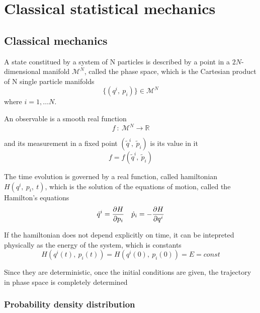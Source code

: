 \part{Classical statistical mechanics}

\chapter{Classical mechanics}

    A state constitued by a system of N particles is described by a point in a $2N$-dimensional manifold $\mathcal M^N$, called the phase space, which is the Cartesian product of N single particle manifolds 
    \begin{equation*}
        \{(q^i, ~p_i)\} \in \mathcal M^N
    \end{equation*}
    where $i = 1, \ldots N$.

    An observable is a smooth real function 
    \begin{equation*}
        f ~\colon~ \mathcal M^N \rightarrow \mathbb R
    \end{equation*}

    and its measurement in a fixed point $(\tilde q^i, ~\tilde p_i)$ is its value in it 
    \begin{equation*}
        f = f(\tilde q^i, ~\tilde p_i)
    \end{equation*}

    The time evolution is governed by a real function, called hamiltonian $H(q^i, ~p_i, ~t)$, which is the solution of the equations of motion, called the Hamilton's equations
    \begin{equation*}
        \dot q^i = \frac{\partial H}{\partial p_i} \quad \dot p_i = - \frac{\partial H}{\partial q^i}
    \end{equation*}
    
    \begin{theorem} \label{consen}
        If the hamiltonian does not depend explicitly on time, it can be intepreted physically as the energy of the system, which is constants
        \begin{equation*}
            H(q^i(t), ~p_i(t)) = H(q^i(0), ~p_i(0)) = E = const
        \end{equation*}
    \end{theorem}

    Since they are deterministic, once the initial conditions are given, the trajectory in phase space is completely determined

\section{Probability density distribution}


